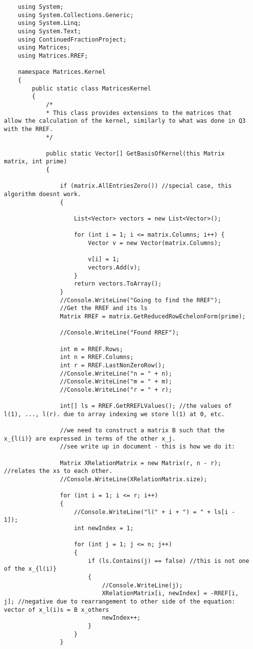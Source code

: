 \documentclass{article}
\begin{document}
\begin{lstlisting}
	using System;
	using System.Collections.Generic;
	using System.Linq;
	using System.Text;
	using ContinuedFractionProject;
	using Matrices;
	using Matrices.RREF;
	
	namespace Matrices.Kernel
	{
		public static class MatricesKernel
		{
			/*
			* This class provides extensions to the matrices that allow the calculation of the kernel, similarly to what was done in Q3 with the RREF.
			*/
			
			public static Vector[] GetBasisOfKernel(this Matrix matrix, int prime)
			{
				
				if (matrix.AllEntriesZero()) //special case, this algorithm doesnt work.
				{
					
					List<Vector> vectors = new List<Vector>();
					
					for (int i = 1; i <= matrix.Columns; i++) {
						Vector v = new Vector(matrix.Columns);
						
						v[i] = 1;
						vectors.Add(v);
					}
					return vectors.ToArray();
				}
				//Console.WriteLine("Going to find the RREF");
				//Get the RREF and its ls
				Matrix RREF = matrix.GetReducedRowEchelonForm(prime);
				
				//Console.WriteLine("Found RREF");
				
				int m = RREF.Rows;
				int n = RREF.Columns;
				int r = RREF.LastNonZeroRow();
				//Console.WriteLine("n = " + n);
				//Console.WriteLine("m = " + m);
				//Console.WriteLine("r = " + r);
				
				int[] ls = RREF.GetRREFLValues(); //the values of l(1), ..., l(r). due to array indexing we store l(1) at 0, etc.
				
				//we need to construct a matrix B such that the x_{l(i)} are expressed in terms of the other x_j.
				//see write up in document - this is how we do it:
				
				Matrix XRelationMatrix = new Matrix(r, n - r); //relates the xs to each other.
				//Console.WriteLine(XRelationMatrix.size);
				
				for (int i = 1; i <= r; i++)
				{
					//Console.WriteLine("l(" + i + ") = " + ls[i - 1]);
					int newIndex = 1;
					
					for (int j = 1; j <= n; j++)
					{
						if (ls.Contains(j) == false) //this is not one of the x_{l(i)}
						{
							//Console.WriteLine(j);
							XRelationMatrix[i, newIndex] = -RREF[i, j]; //negative due to rearrangement to other side of the equation: vector of x_l(i)s = B x_others
							newIndex++;
						}
					}
				}
				

\end{lstlisting}
\end{document}
